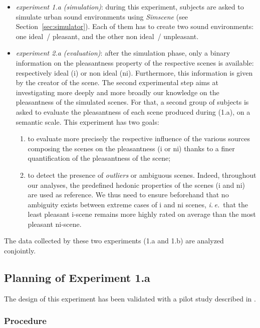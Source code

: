 \documentclass[12pt]{elsarticle}
\newcommand{\ie}{\emph{i.\,e.}}
\begin{document}
\begin{itemize}
\item \emph{experiment 1.a (simulation)}: during this experiment, subjects are asked to simulate urban sound environments using \emph{Simscene} (see Section~\ref{sec:simulator}). Each of them has to create two sound environments: one ideal~/ pleasant, and the other non ideal~/ unpleasant.
\item \emph{experiment 2.a (evaluation)}: after the simulation phase, only a binary information on the pleasantness property of the respective scenes is available: respectively ideal (i) or non ideal (ni). Furthermore, this information is given by the creator of the scene. The second experimental step aims at investigating more deeply and more broadly our knowledge on the pleasantness of the simulated scenes. For that, a second group of subjects is asked to evaluate the pleasantness of each scene produced during (1.a), on a semantic scale. This experiment has two goals:
\begin{enumerate}
\item to evaluate more precisely the respective influence of the various sources composing the scenes on the pleasantness  (i or ni) thanks to a finer quantification of the pleasantness of the scene;
\item to detect the presence of \emph{outliers} or ambiguous scenes. Indeed, throughout our analyses, the predefined hedonic properties of the scenes (i and ni) are used as reference. We thus need to ensure beforehand that no ambiguity exists between extreme cases of i and ni scenes, \ie~that the least pleasant i-scene remains more highly rated on average than the most pleasant ni-scene.
\end{enumerate}
\end{itemize}


The data collected by these two experiments (1.a and 1.b) are analyzed conjointly.

\subsection{Planning of Experiment 1.a}
\label{sec:xp1a_plan}

The design of this experiment has been validated with a pilot study described in \cite{lafay2014new}.

\subsubsection*{Procedure}
\end{document}
